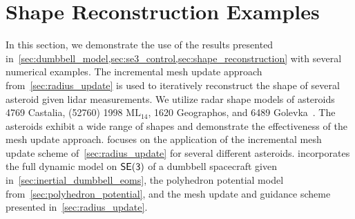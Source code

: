 \section{Shape Reconstruction Examples}
In this section, we demonstrate the use of the results presented in~\cref{sec:dumbbell_model,sec:se3_control,sec:shape_reconstruction} with several numerical examples.
The incremental mesh update approach from~\cref{sec:radius_update} is used to iteratively reconstruct the shape of several asteroid given \gls{lidar} measurements.
We utilize radar shape models of asteroids \num{4769} Castalia, (\num{52760}) \num{1998} \(\text{ML}_{14}\), \num{1620} Geographos, and 6489 Golevka~\cite{neese2004}.
The asteroids exhibit a wide range of shapes and demonstrate the effectiveness of the mesh update approach.
 focuses on the application of the incremental mesh update scheme of~\cref{sec:radius_update} for several different asteroids.
 incorporates the full dynamic model on \( \mathsf{SE(3)} \) of a dumbbell spacecraft given in~\cref{sec:inertial_dumbbell_eoms}, the polyhedron potential model from~\cref{sec:polyhedron_potential}, and the mesh update and guidance scheme presented in~\cref{sec:radius_update}.


